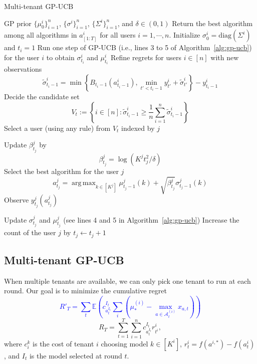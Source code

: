 \documentclass[letterpaper]{vldb}
\DeclareMathOperator*{\argmax}{arg\,max}
\begin{document}
\begin{algorithm} [t]                     %
\scriptsize
\caption{Multi-tenant GP-UCB}          %
\label{alg:mc-general}                           %
\begin{algorithmic}[1]                    %
   \REQUIRE GP prior $\{\mu_0^i\}_{i=1}^n$, $\{\sigma^i\}_{i=1}^n$, $\{\Sigma^i\}_{i=1}^n$, and $\delta\in (0,1)$
   \ENSURE Return the best algorithm among all algorithms in $a_{[1:T]}^i$ for all users $i=1, \cdots, n$.
       \STATE Initialize $\sigma_0^i = \text{diag}(\Sigma^i)$ and $t_i=1$
       \STATE Run one step of GP-UCB (i.e., lines 3 to 5 of Algorithm~\ref{alg:gp-ucb}) for the user $i$ to obtain $\sigma^i_{t_i}$ and $\mu^i_{t_i}$
   \ENDFOR
        \STATE Refine regrets for users $i\in[n]$ with new observations
        \[
   \tilde{\sigma}^i_{t_i-1} = \min\left\{B_{t_i-1}(a^i_{t_i-1}), \min_{t'<t_i-1} y^i_{t'}+ \tilde{\sigma}^{i}_{t'} \right\} - y^i_{t_i-1} 
   \]
      \STATE Decide the candidate set
   \[
     V_t := \left\{ i\in [n]: 
         \tilde{\sigma}^i_{t_i-1} \ge \frac{1}{n}
       \sum_{i=1}^n 
         \tilde{\sigma}^i_{t_i-1}\right\}
   \]
   \STATE Select a user (using any rule) from $V_t$ indexed by $j$

   \STATE  Update $\beta_{t_j}^j$ by
   \[
     \beta_{t_j}^j = \log (K^j t_j^2/\delta)
   \]
   \STATE Select the best algorithm for the user $j$
   \[
     a^j_{t_j} = \argmax_{k\in [K^j]}\mu^j_{{t_j}-1}(k) + \sqrt{\beta^j_{t_j}}\sigma^j_{t_j-1}(k)
     \]
     \STATE Observe $y^j_{t_j}(a^j_{t_j})$

     \STATE Update $\sigma^j_{t_j}$ and $\mu^j_{t_j}$ (see lines 4 and 5 in Algorithm~\ref{alg:gp-ucb})
        \STATE Increase the count of the user $j$ by $t_j \leftarrow t_j + 1$
   \ENDFOR
\end{algorithmic}
\end{algorithm}


\subsection{Multi-tenant GP-UCB}
When multiple tenants are available, we can only pick one tenant to run at each round. Our goal is to minimize the cumulative regret 
\textcolor{blue}{
\[
R'_T = \sum_{t} \mathbb{E}\left(c^{I_t}_{a_t^{I_t}}\sum_{i} \left(\mu^{(i)}_* -  \max_{a\in \mathcal{A}_t^{(i)}}x_{a, t}\right)\right)
\]
}
\[
R_T = \sum_{t=1}^T\sum_{i=1}^n c^{I_t}_{a_{t}^{I_t}}r^i_{t^i},
\]
where $c_i^k$ is the cost of tenant $i$ choosing model $k\in [K^i]$, $r^i_t = f(a^{i,\ast})-f(a^i_t)$, and $I_t$ is the model selected at round $t$.
\end{document}
